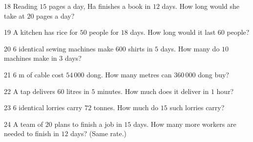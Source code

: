 \gap
\begin{probbox}{18}{\relax}
Reading $15$ pages a day, Ha finishes a book in $12$ days. How long would she take at $20$ pages a day?
\end{probbox}
\gap
\begin{probbox}{19}{\relax}
A kitchen has rice for $50$ people for $18$ days. How long would it last $60$ people?
\end{probbox}
\gap
\begin{probbox}{20}{\relax}
$6$ identical sewing machines make $600$ shirts in $5$ days. How many do $10$ machines make in $3$ days?
\end{probbox}
\gap
\begin{probbox}{21}{\relax}
$6$ m of cable cost $54\,000$ dong. How many metres can $360\,000$ dong buy?
\end{probbox}
\gap
\begin{probbox}{22}{\relax}
A tap delivers $60$ litres in $5$ minutes. How much does it deliver in $1$ hour?
\end{probbox}
\gap
\begin{probbox}{23}{\relax}
$6$ identical lorries carry $72$ tonnes. How much do $15$ such lorries carry?
\end{probbox}
\gap
\begin{probbox}{24}{\relax}
A team of $20$ plans to finish a job in $15$ days. How many more workers are needed to finish in $12$ days? (Same rate.)
\end{probbox}
